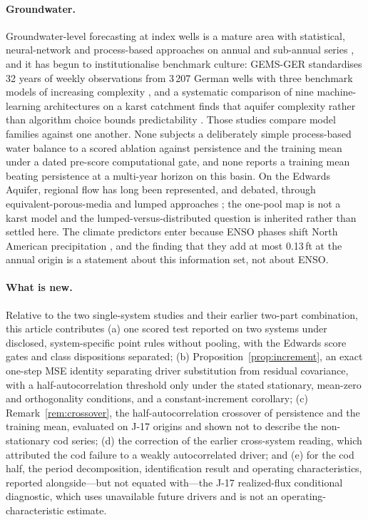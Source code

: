 \paragraph{Groundwater.} Groundwater-level forecasting at index wells is a mature area with statistical, neural-network and process-based approaches on annual and sub-annual series \citep{Daliakopoulos2005,AdamowskiChan2011}, and it has begun to institutionalise benchmark culture: GEMS-GER standardises 32 years of weekly observations from 3\,207 German wells with three benchmark models of increasing complexity \citep{Ohmer2026}, and a systematic comparison of nine machine-learning architectures on a karst catchment finds that aquifer complexity rather than algorithm choice bounds predictability \citep{Zhu2026}. Those studies compare model families against one another. None subjects a deliberately simple process-based water balance to a scored ablation against persistence and the training mean under a dated pre-score computational gate, and none reports a training mean beating persistence at a multi-year horizon on this basin. On the Edwards Aquifer, regional flow has long been represented, and debated, through equivalent-porous-media and lumped approaches \citep{Scanlon2003}; the one-pool map is not a karst model and the lumped-versus-distributed question is inherited rather than settled here. The climate predictors enter because ENSO phases shift North American precipitation \citep{Ropelewski1986}, and the finding that they add at most 0.13\,ft at the annual origin is a statement about this information set, not about ENSO.

\paragraph{What is new.} Relative to the two single-system studies and their earlier two-part combination, this article contributes (a) one scored test reported on two systems under disclosed, system-specific point rules without pooling, with the Edwards score gates and class dispositions separated; (b) Proposition~\ref{prop:increment}, an exact one-step MSE identity separating driver substitution from residual covariance, with a half-autocorrelation threshold only under the stated stationary, mean-zero and orthogonality conditions, and a constant-increment corollary; (c) Remark~\ref{rem:crossover}, the half-autocorrelation crossover of persistence and the training mean, evaluated on J-17 origins and shown not to describe the non-stationary cod series; (d) the correction of the earlier cross-system reading, which attributed the cod failure to a weakly autocorrelated driver; and (e) for the cod half, the period decomposition, identification result and operating characteristics, reported alongside—but not equated with—the J-17 realized-flux conditional diagnostic, which uses unavailable future drivers and is not an operating-characteristic estimate.

